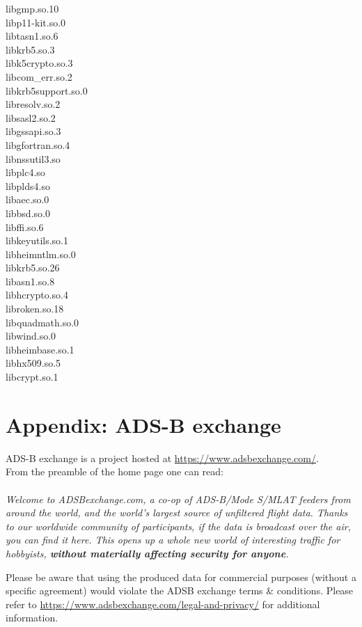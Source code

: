 \begin{multicols}{2}
libgmp.so.10 \\
libp11-kit.so.0 \\
libtasn1.so.6 \\
libkrb5.so.3 \\
libk5crypto.so.3 \\
libcom\_err.so.2 \\
libkrb5support.so.0 \\
libresolv.so.2 \\
libsasl2.so.2 \\
libgssapi.so.3 \\
libgfortran.so.4 \\
libnssutil3.so \\
libplc4.so \\
libplds4.so \\
libaec.so.0 \\
libbsd.so.0 \\
libffi.so.6 \\
libkeyutils.so.1 \\
libheimntlm.so.0 \\
libkrb5.so.26 \\
libasn1.so.8 \\
libhcrypto.so.4 \\
libroken.so.18 \\
libquadmath.so.0 \\
libwind.so.0 \\
libheimbase.so.1 \\
libhx509.so.5 \\
libcrypt.so.1
\end{multicols}

\section{Appendix: ADS-B exchange}
\label{sec:adsbex}

ADS-B exchange is a project hosted at \url{https://www.adsbexchange.com/}. \\

From the preamble of the home page one can read: \\\\
\textit{Welcome to ADSBexchange.com, a co-op of ADS-B/Mode S/MLAT feeders from around the world, and the world's largest source of unfiltered flight data.  Thanks to our worldwide community of participants, if the data is broadcast over the air, you can find it here.  This opens up a whole new world of interesting traffic for hobbyists, \textbf{without materially affecting security for anyone}. \\}

Please be aware that using the produced data for commercial purposes (without a specific agreement) would violate the ADSB exchange terms \& conditions. Please refer to \url{https://www.adsbexchange.com/legal-and-privacy/} for additional information.\\

